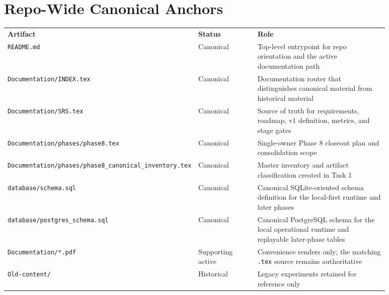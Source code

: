 \documentclass{article}
\begin{document}
\section*{Repo-Wide Canonical Anchors}
\begin{longtable}{p{0.25\linewidth}p{0.18\linewidth}p{0.45\linewidth}}
\textbf{Artifact} & \textbf{Status} & \textbf{Role} \\
\texttt{README.md} & Canonical & Top-level entrypoint for repo orientation and the active documentation path \\
\texttt{Documentation/INDEX.tex} & Canonical & Documentation router that distinguishes canonical material from historical material \\
\texttt{Documentation/SRS.tex} & Canonical & Source of truth for requirements, roadmap, v1 definition, metrics, and stage gates \\
\texttt{Documentation/phases/phase8.tex} & Canonical & Single-owner Phase 8 closeout plan and consolidation scope \\
\texttt{Documentation/phases/phase8\_canonical\_inventory.tex} & Canonical & Master inventory and artifact classification created in Task 1 \\
\texttt{database/schema.sql} & Canonical & Canonical SQLite-oriented schema definition for the local-first runtime and later phases \\
\texttt{database/postgres\_schema.sql} & Canonical & Canonical PostgreSQL schema for the local operational runtime and replayable later-phase tables \\
\texttt{Documentation/*.pdf} & Supporting active & Convenience renders only; the matching \texttt{.tex} source remains authoritative \\
\texttt{Old-content/} & Historical & Legacy experiments retained for reference only \\
\end{longtable}
\end{document}
